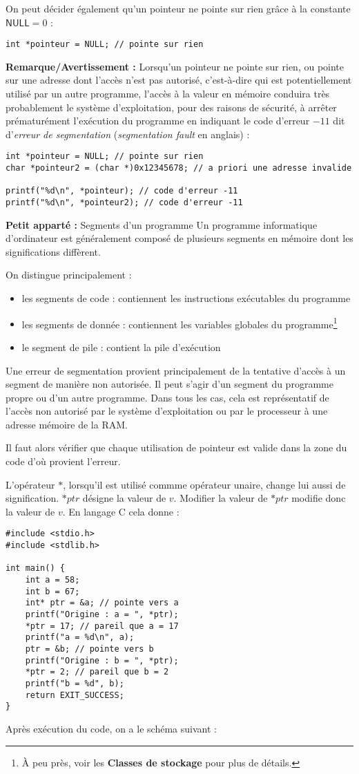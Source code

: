\documentclass[../../../main.tex]{subfiles}
\begin{document}
On peut décider également qu'un pointeur ne pointe sur rien grâce à la constante $\textsf{NULL} = 0$ :
\begin{verbatim}
int *pointeur = NULL; // pointe sur rien
\end{verbatim}
\textbf{Remarque/Avertissement :} Lorsqu'un pointeur ne pointe sur rien, ou pointe sur une adresse dont l'accès n'est pas autorisé, c'est-à-dire qui est potentiellement utilisé par un autre programme, l'accès à la valeur en mémoire conduira très probablement le système d'exploitation, pour des raisons de sécurité, à arrêter prématurément l'exécution du programme en indiquant le code d'erreur $-11$ dit d'\textit{erreur de segmentation} (\textit{segmentation fault} en anglais) :
\begin{verbatim}
int *pointeur = NULL; // pointe sur rien
char *pointeur2 = (char *)0x12345678; // a priori une adresse invalide 

printf("%d\n", *pointeur); // code d'erreur -11
printf("%d\n", *pointeur2); // code d'erreur -11
\end{verbatim}
\begin{minitelbasicbox}{\textbf{Petit apparté :} Segments d'un programme}
Un programme informatique d'ordinateur est généralement composé de plusieurs segments en mémoire dont les significations diffèrent.

On distingue principalement :
\begin{itemize}
	\item les segments de code : contiennent les instructions exécutables du programme
	\item les segments de donnée : contiennent les variables globales du programme\footnote{À peu près, voir les \textbf{Classes de stockage} pour plus de détails.}
	\item le segment de pile : contient la pile d'exécution
\end{itemize}
Une erreur de segmentation provient principalement de la tentative d'accès à un segment de manière non autorisée. Il peut s'agir d'un segment du programme propre ou d'un autre programme. Dans tous les cas, cela est représentatif de l'accès non autorisé par le système d'exploitation ou par le processeur à une adresse mémoire de la RAM.

Il faut alors vérifier que chaque utilisation de pointeur est valide dans la zone du code d'où provient l'erreur.
\end{minitelbasicbox}

L'opérateur $*$, lorsqu'il est utilisé commme opérateur unaire, change lui aussi de signification. $*ptr$ désigne la valeur de $v$. Modifier la valeur de $*ptr$ modifie donc la valeur de $v$. En langage C cela donne :
\begin{verbatim}
#include <stdio.h>
#include <stdlib.h>

int main() {
	int a = 58;
	int b = 67;
	int* ptr = &a; // pointe vers a
	printf("Origine : a = ", *ptr);
	*ptr = 17; // pareil que a = 17
	printf("a = %d\n", a);
	ptr = &b; // pointe vers b
	printf("Origine : b = ", *ptr);
	*ptr = 2; // pareil que b = 2
	printf("b = %d", b);
	return EXIT_SUCCESS;
}
\end{verbatim}
Après exécution du code, on a le schéma suivant :
\end{document}
